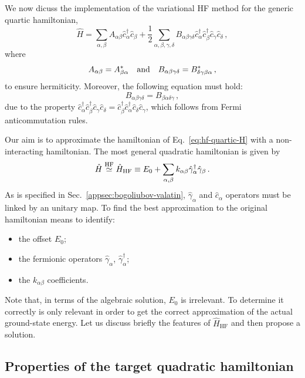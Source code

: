 We now dicuss the implementation of the variational HF method for the generic quartic hamiltonian,
\begin{equation}\label{eq:hf-quartic-H}
	\hat H = \sum_{\alpha,\beta} A_{\alpha\beta} \hat c_\alpha^\dagger \hat c_\beta + \frac{1}{2} \sum_{\alpha,\beta,\gamma,\delta} B_{\alpha\beta\gamma\delta} \hat c_\alpha^\dagger \hat c_\beta^\dagger \hat c_\gamma \hat c_\delta \, ,
\end{equation}
where
\begin{equation}\label{eq:hf-AB-syms}
	A_{\alpha\beta} = A_{\beta\alpha}^*
	\qq{and}
	B_{\alpha\beta\gamma\delta} = B_{\delta\gamma\beta\alpha}^* \, ,
\end{equation}
to ensure hermiticity. Moreover, the following equation must hold:
\begin{equation}\label{eq:hf-B-sym}
	B_{\alpha\beta\gamma\delta} = B_{\beta\alpha\delta\gamma} \, ,
\end{equation}
due to the property $\hat c_\alpha^\dagger \hat c_\beta^\dagger \hat c_\gamma \hat c_\delta = \hat c_\beta^\dagger \hat c_\alpha^\dagger \hat c_\delta \hat c_\gamma$, which follows from Fermi anticommutation rules.

Our aim is to approximate the hamiltonian of Eq.~\eqref{eq:hf-quartic-H} with a non-interacting hamiltonian. The most general quadratic hamiltonian is given by
\begin{equation}\label{eq:hf-Hhf-k}
	\hat H \stackrel{\mathrm{HF}}{\simeq} \hat H_\mathrm{HF} \equiv E_0 + \sum_{\alpha,\beta} k_{\alpha\beta} \hat\gamma_\alpha^\dagger \hat\gamma_\beta \, .
\end{equation}
As is specified in Sec.~\ref{appsec:bogoliubov-valatin}, $\hat \gamma_\alpha$ and $\hat c_\alpha$ operators must be linked by an unitary map. To find the best approximation to the original hamiltonian means to identify:
\begin{itemize}
	\item the offset $E_0$;
	\item the fermionic operators $\hat \gamma_\alpha$, $\hat \gamma_\alpha^\dagger$;
	\item the $k_{\alpha\beta}$ coefficients. 
\end{itemize}
Note that, in terms of the algebraic solution, $E_0$ is irrelevant. To determine it correctly is only relevant in order to get the correct approximation of the actual ground-state energy. Let us discuss briefly the features of $\hat H_\mathrm{HF}$ and then propose a solution.

\subsection{Properties of the target quadratic hamiltonian}

